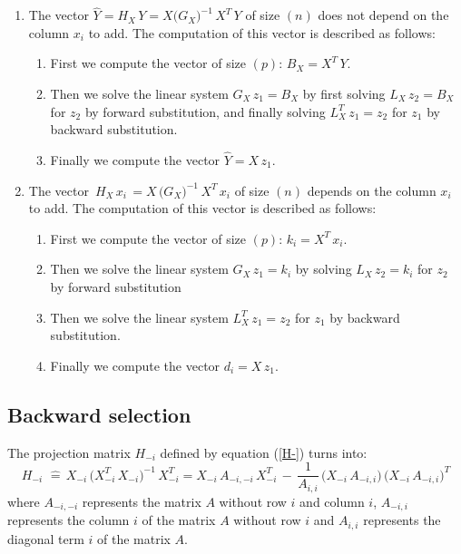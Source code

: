 \begin{enumerate}
\item The vector $\hat{Y}=H_X\,Y=X\big(G_X\big)^{-1}\,X^T\,Y $ of size $(n)$ does not depend on the column $x_i$ to add.
The computation of this vector is described as follows:
\begin{enumerate}
\item First we compute the vector of size $(p)$: $B_X=X^T\,Y$.
\item Then we solve the linear system $G_X \,z_1= B_X$ by first solving $L_X\,z_2= B_X$ for $z_2$ by forward substitution, and finally
 solving $L_X^T\,z_1=z_2$ for $z_1$ by backward substitution.
\item Finally we compute the vector $\hat{Y}=X\,z_1$.
\end{enumerate}
\item The vector $\,H_X\,x_i\,=X\,\big(G_X\big)^{-1}\,X^T\,x_i$ of size $(n)$ depends on the column $x_i$ to add.
The computation of this vector is described as follows:
\begin{enumerate}
\item First we compute the vector of size $(p)$: $ k_i=X^T\,x_i$.
\item Then we solve the linear system $G_X \,z_1= k_i$ by solving $L_X\,z_2= k_i$ for $z_2$ by forward substitution
\item Then we solve the linear system $L_X^T\,z_1=z_2$ for $z_1$ by backward substitution.
\item Finally we compute the vector $d_i = X\,z_1$.
\end{enumerate}
\end{enumerate}



\newpage
\subsection{Backward selection}
The projection matrix $H_{-i}$ defined by equation (\ref{H-}) turns into:
 \begin{equation}
\label{H2-}
H_{-i}\, \,\hat{=}\, X_{-i}\,\big(X^T_{-i} \,X_{-i}\big)^{-1} \,X^T_{-i}
= X_{-i}\,A_{-i,-i} \, X^T_{-i} \,-\,\frac {1}{A_{i,i}}\,\big(X_{-i}\, A_{-i,i}\big)\, \big(X_{-i}\, A_{-i,i}\big)^T
 \end{equation}
where $A_{-i,-i}$ represents the matrix $A$ without row $i$ and column $i$,
$A_{-i,i}$ represents the column $i$ of the matrix $A$ without row $i$ and $A_{i,i}$ represents the diagonal term $i$ of the matrix $A$.\\

